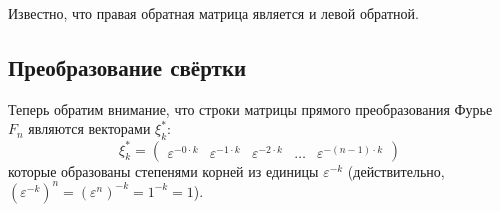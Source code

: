 Известно, что правая обратная матрица является и левой обратной.

\subsection{Преобразование свёртки}

Теперь обратим внимание, что строки матрицы прямого преобразования Фурье $F_n$ являются векторами $\xi_k^*$:
\[
    \xi_k^*
    = \begin{pmatrix}
        \varepsilon^{- 0 \cdot k} & \varepsilon^{- 1 \cdot k} & \varepsilon^{- 2 \cdot k} & \dots & \varepsilon^{- (n-1) \cdot k}
    \end{pmatrix}
\]
которые образованы степенями корней из единицы $\varepsilon^{-k}$ (действительно, $\left ( \varepsilon^{-k} \right )^n = \left ( \varepsilon^n \right )^{-k} = 1^{-k} = 1$).

